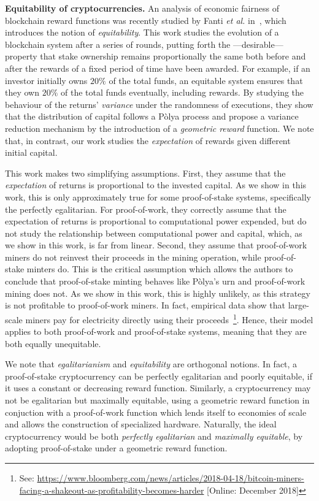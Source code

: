 
\noindent\textbf{Equitability of cryptocurrencies.}
An analysis of economic fairness of
blockchain reward functions was recently studied by Fanti \textit{et al.} in~\cite{fanti2018compounding}, which
introduces the notion of \emph{equitability}. This work studies the evolution
of a blockchain system after a series of rounds, putting forth the
---desirable--- property that stake ownership remains proportionally the same
both before and after the rewards of a fixed period of time have been awarded.
For example, if an
investor initially owns $20\%$ of the total funds, an equitable system ensures that they
own $20\%$ of the total funds eventually, \ie including
rewards. By studying the behaviour of the returns' \emph{variance} under the
randomness of executions, they show that the distribution of capital
follows a Pòlya process and propose a variance reduction mechanism
by the introduction of a \emph{geometric reward} function.
We note that, in contrast, our work studies the \emph{expectation} of rewards given different
initial capital.

This work makes two simplifying assumptions.
First, they assume that the \emph{expectation} of returns is proportional to the
invested capital. As we show in this work, this is only
approximately true for some proof-of-stake systems, specifically the perfectly egalitarian. For proof-of-work, they
correctly assume that the expectation of returns is proportional to computational
power expended, but do not study the relationship between computational power and
capital, which, as we show in this work, is far from linear. Second, they assume that
proof-of-work miners do not reinvest their proceeds in the
mining operation, while proof-of-stake minters do. This is the critical assumption which allows the authors to
conclude that proof-of-stake minting behaves like Pòlya's urn and
proof-of-work mining does not. As we show in this work, this
is highly unlikely, as this strategy is not profitable to proof-of-work
miners. In fact, empirical data show that large-scale miners pay for electricity
directly using their proceeds~\footnote{See:
\url{https://www.bloomberg.com/news/articles/2018-04-18/bitcoin-miners-facing-a-shakeout-as-profitability-becomes-harder}
[Online: December 2018]}. Hence, their model applies to both proof-of-work and
proof-of-stake systems, meaning that they are both equally unequitable.

We note that \emph{egalitarianism} and \emph{equitability} are orthogonal
notions. In fact, a proof-of-stake cryptocurrency can be perfectly egalitarian
and poorly equitable, \eg if it uses a constant or decreasing reward function.
Similarly, a cryptocurrency may not be egalitarian but maximally equitable, \eg
using a geometric reward function in conjuction with a proof-of-work function
which lends itself to economies of scale and allows the construction of
specialized hardware. Naturally, the ideal cryptocurrency would be both
\emph{perfectly egalitarian} and \emph{maximally equitable}, \eg by adopting
proof-of-stake under a geometric reward function.

